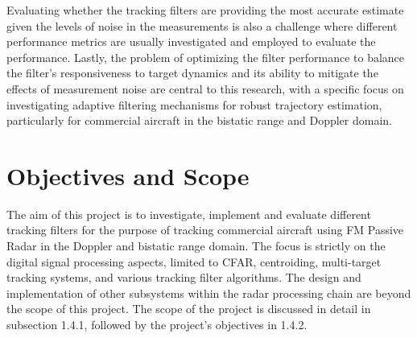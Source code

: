 Evaluating whether the tracking filters are providing the most accurate estimate given the levels of noise in the measurements is also a challenge where different performance metrics are usually investigated and employed to evaluate the performance. Lastly, the problem of optimizing the filter performance to balance the filter's responsiveness to target dynamics and its ability to mitigate the effects of measurement noise are central to this research, with a specific focus on investigating adaptive filtering mechanisms for robust trajectory estimation, particularly for commercial aircraft in the bistatic range and Doppler domain.

\section{Objectives and Scope}
The aim of this project is to investigate, implement and evaluate different tracking filters for the purpose of tracking commercial aircraft using \ac{FM} Passive Radar in the Doppler and bistatic range domain. The focus is strictly on the digital signal processing aspects, limited to \ac{CFAR}, centroiding, multi-target tracking systems, and various tracking filter algorithms. The design and implementation of other subsystems within the radar processing chain are beyond the scope of this project. The scope of the project is discussed in detail in subsection 1.4.1, followed by the project's objectives in 1.4.2.
\newline

